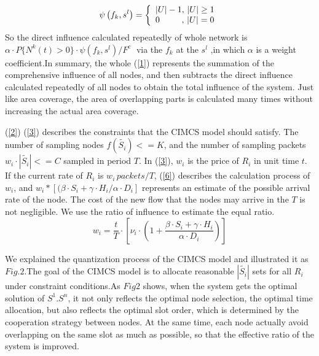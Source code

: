 \documentclass[conference]{IEEEtran}
\begin{document}
\begin{equation}
\psi \left( {{f_k},{s^l}} \right) = \left\{ \begin{array}{l}
\left| U \right| - 1,{\rm{    }}\left| U \right| \ge 1\\
{\rm{   }}0\quad \quad \; \; ,\, \left| U \right| = 0
\end{array} \right.\label{5}
\end{equation}
So the direct influence calculated repeatedly of whole network is ${\alpha \cdot P\{{{N}^{k}}(t)>0\}\cdot \psi ({{f}_{k}},{{s}^{l}})}/{{{F}^{c}}}\;$ via the $f_k$ at the ${{s}^{l}}$ ,in which $\alpha$ is a weight coefficient.In summary, the whole (\ref{1}) represents the summation of the comprehensive influence of all nodes, and then subtracts the direct influence calculated repeatedly of all nodes to obtain the total influence of the system. Just like area coverage, the area of overlapping parts is calculated many times without increasing the actual area coverage.

(\ref{2}) (\ref{3}) describes the constraints that the CIMCS model should satisfy. The number of sampling nodes $f(\widetilde{{{S}_{i}}})<= K$, and the number of sampling packets $w_i \cdot |\widetilde{{{S}_{i}}}|<=C$ sampled in period $T$. In (\ref{3}), $w_i$ is the price of $R_i$ in unit time $t$. If the current rate of $R_i$ is $w_i\, packets/T$, (\ref{6}) describes the calculation process of $w_i$, and $w_i*[(\beta \cdot {S_i}+ \gamma \cdot {H_i}/\alpha \cdot {D_i}]$ represents an estimate of the possible arrival rate of the node. The cost of the new flow that the nodes may arrive in the $T$ is not negligible. We use the ratio of influence to estimate the equal ratio.
\begin{equation}
{{w}_{i}}=\frac{t}{T}\cdot [{{\nu }_{i}}\cdot (1+\frac{\beta \cdot {{S}_{i}}+\gamma \cdot {{H}_{i}}}{\alpha \cdot {{D}_{i}}})]\label{6}
\end{equation}

We explained the quantization process of the CIMCS model and illustrated it as $Fig.2$.The goal of the CIMCS model is to allocate reasonable $|\widetilde{{{S}_{i}}}|$ sets for all $R_i$ under constraint conditions.As $Fig2$ shows, when the system gets the optimal solution of $S ^ 1. S ^ n $, it not only reflects the optimal node selection, the optimal time allocation, but also reflects the optimal slot order, which is determined by the cooperation strategy between nodes. At the same time, each node actually avoid overlapping on the same slot as much as possible, so that the effective ratio of the system is improved.
\end{document}
